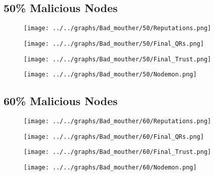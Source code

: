 \begin{minipage}[t]{0.49\columnwidth}
\subsection*{50\% Malicious Nodes}
    \begin{figure}[H]
        \centering
        \texttt{[image: ../../graphs/Bad\_mouther/50/Reputations.png]}
    \end{figure}
    \begin{figure}[H]
        \centering
        \texttt{[image: ../../graphs/Bad\_mouther/50/Final\_QRs.png]}
    \end{figure}
\end{minipage}
\begin{minipage}[t]{0.49\columnwidth}
    \begin{figure}[H]
        \centering
        \texttt{[image: ../../graphs/Bad\_mouther/50/Final\_Trust.png]}
    \end{figure}
    \begin{figure}[H]
        \centering
        \texttt{[image: ../../graphs/Bad\_mouther/50/Nodemon.png]}
    \end{figure}
\end{minipage}

\begin{minipage}[t]{0.49\columnwidth}
\subsection*{60\% Malicious Nodes}
    \begin{figure}[H]
        \centering
        \texttt{[image: ../../graphs/Bad\_mouther/60/Reputations.png]}
    \end{figure}
    \begin{figure}[H]
        \centering
        \texttt{[image: ../../graphs/Bad\_mouther/60/Final\_QRs.png]}
    \end{figure}
\end{minipage}
\begin{minipage}[t]{0.49\columnwidth}
    \begin{figure}[H]
        \centering
        \texttt{[image: ../../graphs/Bad\_mouther/60/Final\_Trust.png]}
    \end{figure}
    \begin{figure}[H]
        \centering
        \texttt{[image: ../../graphs/Bad\_mouther/60/Nodemon.png]}
    \end{figure}
\end{minipage}

